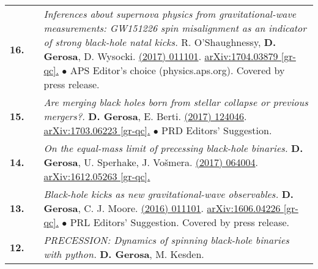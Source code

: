 {\begin{longtable}{rp{0.3cm}p{15.8cm}}
%
\textbf{16.} & & \textit{Inferences about supernova physics from gravitational-wave measurements: GW151226 spin misalignment as an indicator of strong black-hole natal kicks.}
\newline{}
R. O'Shaughnessy, \textbf{D. Gerosa}, D. Wysocki.
\newline{}
\href{http://dx.doi.org/10.1103/PhysRevLett.119.011101}{\prl 119 (2017) 011101}. \href{https://arxiv.org/abs/1704.03879}{arXiv:1704.03879 [gr-qc].}
\newline{}
\textcolor{color1}{$\bullet$} APS Editor's choice (physics.aps.org). Covered by press release.
\vspace{0.09cm}\\
%
\textbf{15.} & & \textit{Are merging black holes born from stellar collapse or previous mergers?.}
\newline{}
\textbf{D. Gerosa}, E. Berti.
\newline{}
\href{http://dx.doi.org/10.1103/PhysRevD.95.124046}{\prd 95 (2017) 124046}. \href{https://arxiv.org/abs/1703.06223}{arXiv:1703.06223 [gr-qc].}
\newline{}
\textcolor{color1}{$\bullet$} PRD Editors' Suggestion.
\vspace{0.09cm}\\
%
\textbf{14.} & & \textit{On the equal-mass limit of precessing black-hole binaries.}
\newline{}
\textbf{D. Gerosa}, U. Sperhake, J. Vo\v{s}mera.
\newline{}
\href{http://dx.doi.org/10.1088/1361-6382/aa5e58}{\cqg 34 (2017) 064004}. \href{https://arxiv.org/abs/1612.05263}{arXiv:1612.05263 [gr-qc].}
\vspace{0.09cm}\\
%
\textbf{13.} & & \textit{Black-hole kicks as new gravitational-wave observables.}
\newline{}
\textbf{D. Gerosa}, C. J. Moore.
\newline{}
\href{http://dx.doi.org/10.1103/PhysRevLett.117.011101}{\prl 117 (2016) 011101}. \href{https://arxiv.org/abs/1606.04226}{arXiv:1606.04226 [gr-qc].}
\newline{}
\textcolor{color1}{$\bullet$} PRL Editors' Suggestion. Covered by press release.
\vspace{0.09cm}\\
%
\textbf{12.} & & \textit{PRECESSION: Dynamics of spinning black-hole binaries with python.}
\newline{}
\textbf{D. Gerosa}, M. Kesden.
\newline{}

\end{longtable}}
